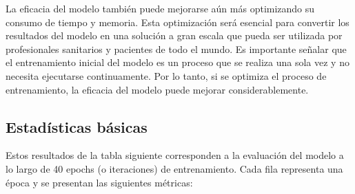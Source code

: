 La eficacia del modelo también puede mejorarse aún más optimizando su consumo de tiempo y memoria. Esta optimización será esencial para convertir los resultados del modelo en una solución a gran escala que pueda ser utilizada por profesionales sanitarios y pacientes de todo el mundo. Es importante señalar que el entrenamiento inicial del modelo es un proceso que se realiza una sola vez y no necesita ejecutarse continuamente. Por lo tanto, si se optimiza el proceso de entrenamiento, la eficacia del modelo puede mejorar considerablemente.

	\subsection{Estadísticas básicas}\label{sub:basic_statistics}
    
    Estos resultados de la tabla siguiente corresponden a la evaluación del modelo a lo largo de 40 epochs (o iteraciones) de entrenamiento. Cada fila representa una época y se presentan las siguientes métricas:
    
